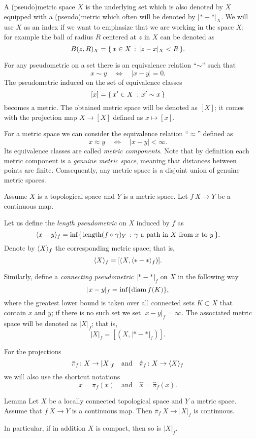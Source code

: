 \documentclass{article}
\begin{document}
A (pseudo)metric space $X$ is the underlying set which is also denoted by $X$ equipped with a (pseudo)metric which often will be denoted by $|{*}-{*}|_X$.
We will use $X$ as an index if we want to emphasize that we are working in the space $X$;
for example the ball of radius $R$ centered at $z$ in $X$ can be denoted as
\[B(z,R)_X=\{\,{x\in X}\,:\,{|z-x|_X<R}\,\}.\]


For any pseudometric on a set there is an equivalence relation ``$\sim$'' such that 
\[x\sim y\quad\iff\quad|x-y|=0.\]
The pseudometric induced  on the set of equivalence classes 
\[[x]=\{\,{x'\in X}\,:\,{x'\sim x}\,\}\] becomes a metric.
The obtained metric space will be denoted as $[X]$;
it comes with the projection map $X\to [X]$ defined as $x\mapsto [x]$.

For a metric space we can consider the equivalence relation ``$\approx$'' defined as 
\[x\approx y\quad\iff\quad|x-y|<\infty.\]
Its equivalence classes are called \emph{metric components}.
Note that by definition each metric component is a \emph{genuine metric space}, meaning that distances between points are finite.
Consequently, any metric space is a disjoint union of genuine metric spaces.

Assume $X$ is a topological space and $Y$ is a metric space.
Let $f\:X\to Y$ be a continuous map. 

Let us define the \emph{length pseudometric} on $X$ induced by $f$ as
\[\< x-y\>_f
=
\inf
\set{\length(f\circ\gamma)_Y}{\gamma\ \text{a path in}\  X\ \text{from}\ x\ \text{to}\ y}.\]
Denote by $\langle X\rangle_f$ the corresponding metric space; that is,
\[\langle X\rangle_f=[(X,\langle{*}-{*}\rangle_f)].\] 

Similarly, define a \emph{connecting pseudometric} $|{*}-{*}|_f$ on $X$ in
the following way
\[|x-y|_f=\inf\{\mathop{\rm diam}\nolimits f(K)\},\]
where the greatest lower bound is taken over all connected sets $K\subset X$ that contain $x$ and $y$;
if there is no such set we set $|x-y|_f=\infty$. 
The associated metric space will be
denoted as $|X|_f$;
that is,
\[| X|_f=[(X,|{*}-{*}|_f)].\]

For the projections 
\[\bar \pi_f\colon X\to |X|_f\quad\text{and}\quad \hat \pi_f\colon X\to \langle X\rangle_f\]
we will also use the shortcut notations 
\[\bar x=\bar\pi_f(x) \quad\text{and}\quad  \hat x= \hat \pi_f(x).\]

\begin{thm}{Lemma}\label{lem:picont}
Let $X$ be a locally connected topological space and $Y$ a metric space. Assume that $f\:X\to Y$ is a continuous map. 
Then $\bar\pi_f\:X\to|X|_f$ is continuous.

In particular, if in addition $X$ is compact, then so is $|X|_f$.
\end{thm}
\end{document}
